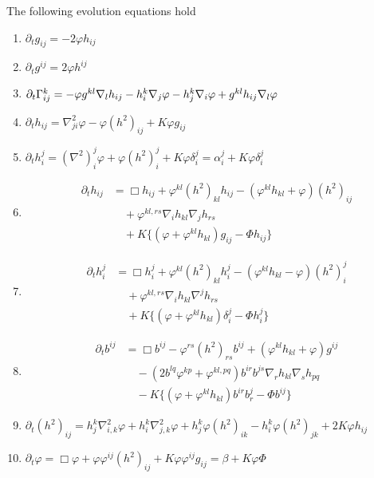 \documentclass{amsart}
\begin{document}
\begin{lemma}
\label{lem:evolution}
The following evolution equations hold
\begin{enumerate}
\item \label{eq:delt_metric} $\partial_tg_{ij} = -2\varphi h_{ij}$
\item \label{eq:delt_inversemetric} $\partial_t g^{ij} = 2\varphi h^{ij}$
\item \label{eq:delt_christoffel} $\partial_t {\Gamma}^{k}_{ij} = -\varphi g^{kl} \nabla_l h_{ij} - h^k_i \nabla_j \varphi - h^k_j \nabla_i \varphi + g^{kl} h_{ij} \nabla_l \varphi$
\item \label{eq:delt_sff} $\partial_t h_{ij} = \nabla^2_{ji} \varphi - \varphi(h^2)_{ij} + K \varphi g_{ij}$
\item \label{eq:delt_weingarten} $\partial_t h_i^j = (\nabla^2)^j_i\varphi + \varphi(h^2)_i^j + K \varphi\delta_i^j = \alpha^j_i + K \varphi\delta_i^j$
\item \label{eq:delt_sff_box} \begin{align*}
\partial_t h_{ij} &= \Box h_{ij} + \varphi^{kl} (h^2)_{kl} h_{ij} - (\varphi^{kl}h_{kl} + \varphi) (h^2)_{ij} \\
& \quad + \varphi^{kl,rs}\nabla_i h_{kl}\nabla_j h_{rs} \\
& \quad + K \{(\varphi + \varphi^{kl}h_{kl}) g_{ij} - \Phi h_{ij}\}
\end{align*}
\item \label{eq:delt_weingarten_box} \begin{align*}
\partial_t h_i^j &= \Box h_i^j + \varphi^{kl} (h^2)_{kl} h_i^j - (\varphi^{kl}h_{kl} - \varphi) (h^2)_i^j \\
& \quad + \varphi^{kl,rs}\nabla_i h_{kl}\nabla^j h_{rs} \\
& \quad + K \{(\varphi + \varphi^{kl}h_{kl}) \delta_i^j - \Phi h_i^j\}
\end{align*}
\item \label{eq:delt_inversesff} \begin{align*}
\partial_t b^{ij} &= \Box b^{ij} - \varphi^{rs} (h^2)_{rs} b^{ij} + (\varphi^{kl}h_{kl} + \varphi) g^{ij} \\
& \quad - \left(2b^{lq}\varphi^{kp} + \varphi^{kl,pq}\right) b^{ir}b^{js} \nabla_r h_{kl} \nabla_s h_{pq} \\
& \quad - K \{(\varphi + \varphi^{kl}h_{kl}) b^{ir}b^{j}_{r} - \Phi b^{ij}\}
\end{align*}
\item \label{eq:delt_squaredsff} $\partial_t (h^2)_{ij} = h^k_j \nabla^2_{i,k} \varphi + h^k_i \nabla^2_{j,k} \varphi + h^k_j \varphi(h^2)_{ik} - h^k_i \varphi(h^2)_{jk} + 2K\varphi h_{ij}$
\item \label{eq:delt_speed} $\partial_t \varphi = \Box \varphi + \varphi\varphi^{ij}(h^2)_{ij} + K \varphi\varphi^{ij}g_{ij} = \beta + K\varphi\Phi$
\end{enumerate}
\end{lemma}
\end{document}
